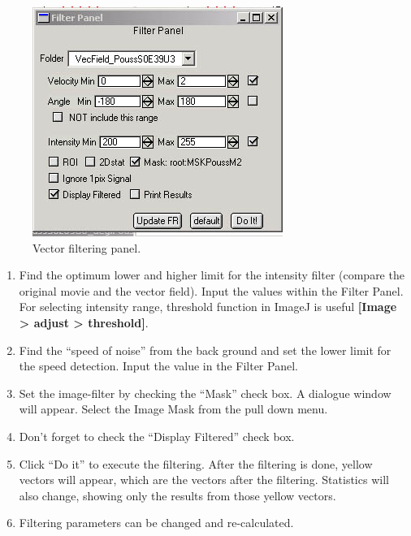 \documentclass{article}
\begin{document}
\begin{figure}[!ht]
\begin{center}
\includegraphics[scale=0.7]{img/filterpanel.jpg}
\caption{ Vector filtering panel.}
\label{fig:vecfilterGUI}
\end{center}
\end{figure}

\begin{enumerate}
\item
  Find the optimum lower and higher limit for the intensity filter
  (compare the original movie and the vector field). Input the values
  within the Filter Panel. For selecting intensity range, threshold
  function in ImageJ is useful \textbf{{[}Image \textgreater{} adjust
  \textgreater{} threshold{]}}.
\item
  Find the ``speed of noise'' from the back ground and set the lower
  limit for the speed detection. Input the value in the Filter Panel.
\item
  Set the image-filter by checking the ``Mask'' check box. A dialogue
  window will appear. Select the Image Mask from the pull down menu.
\item
  Don't forget to check the ``Display Filtered'' check box.
\item
  Click ``Do it'' to execute the filtering. After the filtering is done,
  yellow vectors will appear, which are the vectors after the filtering.
  Statistics will also change, showing only the results from those
  yellow vectors.
\item
  Filtering parameters can be changed and re-calculated.
\end{enumerate}
\end{document}
